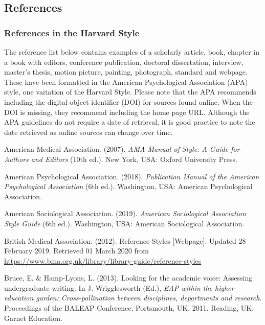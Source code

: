 \documentclass[english, 12pt, a4paper, elec, utf8, a-2b, online]{aaltothesis}
\begin{document}
\subsection*{References}
\subsubsection*{References in the Harvard Style}

The reference list below contains examples of a scholarly article, book, chapter
in a book with editors, conference publication, doctoral dissertation, 
interview, master’s thesis, motion picture, painting, photograph, standard and 
webpage. These have been formatted in the American Psychological Association 
(APA) style, one variation of the Harvard Style. Please note that the APA 
recommends including the digital object identifier (DOI) for sources found 
online. When the DOI is missing, they recommend including the home page URL. 
Although the APA guidelines do not require a date of retrieval, it is good 
practice to note the date retrieved as online sources can change over time.

\vspace{1ex}
\noindent
American Medical Association. (2007). 
\textit{AMA Manual of Style: A Guide for Authors and Editors} 
(10th ed.). New York, USA: Oxford University Press.

\vspace{1ex}
\noindent
American Psychological Association. (2018). 
\textit{Publication Manual of the American Psychological Association} 
(6th ed.). Washington, USA: American Psychological Association.

\vspace{1ex}
\noindent
American Sociological Association. (2019). 
\textit{American Sociological Association Style Guide} 
(6th ed.). Washington, USA: American Sociological Association.

\vspace{1ex}
\noindent
British Medical Association. (2012). 
Reference Styles [Webpage]. Updated 28 February 2019. 
Retrieved 01 March 2020 from 
\url{https://www.bma.org.uk/library/library-guide/reference-styles}

\vspace{1ex}
\noindent
Bruce, E. \& Hamp-Lyons, L. (2013). 
Looking for the academic voice: Assessing undergraduate writing. 
In J. Wrigglesworth (Ed.), 
\textit{EAP within the higher education garden: Cross-pollination between 
	disciplines, departments and research}. 
Proceedings of the BALEAP Conference, Portsmouth, UK, 2011. Reading, UK: Garnet
Education.
\end{document}
